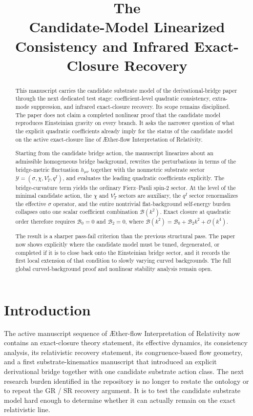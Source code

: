 \documentclass[11pt]{article}
\title{\textbf{The \TheoryName{}}\\[0.4em]
\large Candidate-Model Linearized Consistency and Infrared Exact-Closure Recovery}
\author{}
\date{}
\newcommand{\Aflow}{\AE{}ther-flow}
\newcommand{\TheoryName}{\Aflow{} Interpretation of Relativity}
\newcommand{\Extra}{\mathcal{Y}}
\begin{document}
\maketitle

\begin{abstract}
This manuscript carries the candidate substrate model of the derivational-bridge paper through the next dedicated test stage: coefficient-level quadratic consistency, extra-mode suppression, and infrared exact-closure recovery. Its scope remains disciplined. The paper does not claim a completed nonlinear proof that the candidate model reproduces Einsteinian gravity on every branch. It asks the narrower question of what the explicit quadratic coefficients already imply for the status of the candidate model on the active exact-closure line of \TheoryName{}.

Starting from the candidate bridge action, the manuscript linearizes about an admissible homogeneous bridge background, rewrites the perturbations in terms of the bridge-metric fluctuation \(h_{\mu\nu}\) together with the nonmetric substrate sector \(\Extra=(\sigma,\chi,V^i_T,q^I)\), and evaluates the leading quadratic coefficients explicitly. The bridge-curvature term yields the ordinary Fierz--Pauli spin-2 sector. At the level of the minimal candidate action, the \(\chi\) and \(V_T^i\) sectors are auxiliary, the \(q^I\) sector renormalizes the effective \(\sigma\) operator, and the entire nontrivial flat-background self-energy burden collapses onto one scalar coefficient combination \(\mathcal B(k^2)\). Exact closure at quadratic order therefore requires \(\mathcal B_0=0\) and \(\mathcal B_2=0\), where \(\mathcal B(k^2)=\mathcal B_0+\mathcal B_2k^2+\mathcal O(k^4)\).

The result is a sharper pass-fail criterion than the previous structural pass. The paper now shows explicitly where the candidate model must be tuned, degenerated, or completed if it is to close back onto the Einsteinian bridge sector, and it records the first local extension of that condition to slowly varying curved backgrounds. The full global curved-background proof and nonlinear stability analysis remain open.
\end{abstract}

\section{Introduction}

The active manuscript sequence of \TheoryName{} now contains an exact-closure theory statement, its effective dynamics, its consistency analysis, its relativistic recovery statement, its congruence-based flow geometry, and a first substrate-kinematics manuscript that introduced an explicit derivational bridge together with one candidate substrate action class. The next research burden identified in the repository is no longer to restate the ontology or to repeat the GR / SR recovery argument. It is to test the candidate substrate model hard enough to determine whether it can actually remain on the exact relativistic line.
\end{document}
